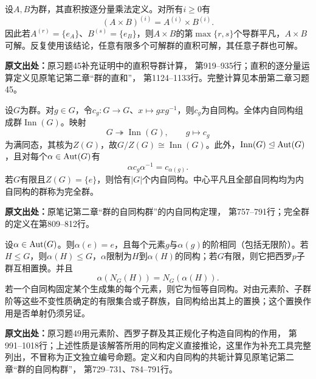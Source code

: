 \begin{reviewprop}[可解群的有限直积]\label{tool:a-solvable-product}
设$A,B$为群，其直积按逐分量乘法定义。对所有$i\ge0$有
\[
(A\times B)^{(i)}=A^{(i)}\times B^{(i)}.
\]
因此若$A^{(r)}=\{e_A\}$、$B^{(s)}=\{e_B\}$，则$A\times B$的第$\max\{r,s\}$个导群平凡，$A\times B$可解。反复使用该结论，任意有限多个可解群的直积可解，其任意子群也可解。

\textbf{原文出处：}原习题45补充证明中的直积导群计算， 第919--935行；直积的逐分量运算定义见原笔记第二章“群的直和”， 第1124--1133行。完整计算见本册第二章习题45。
\end{reviewprop}

\begin{reviewtheorem}[内自同构群与中心商群]\label{tool:a-inner-automorphisms}
设$G$为群。对$g\in G$，令$c_g:G\to G$、$x\mapsto gxg^{-1}$，则$c_g$为自同构。全体内自同构组成群$\operatorname{Inn}(G)$。映射
\[
G\twoheadrightarrow\operatorname{Inn}(G),\qquad g\longmapsto c_g
\]
为满同态，其核为$Z(G)$，故$G/Z(G)\cong\operatorname{Inn}(G)$。此外，$\operatorname{Inn}(G)\trianglelefteq\operatorname{Aut}(G)$，且对每个$\alpha\in\operatorname{Aut}(G)$有
\[
\alpha c_g\alpha^{-1}=c_{\alpha(g)}.
\]
若$G$有限且$Z(G)=\{e\}$，则恰有$|G|$个内自同构。中心平凡且全部自同构均为内自同构的群称为完全群。

\textbf{原文出处：}原笔记第二章“群的自同构群”的内自同构定理， 第757--791行；完全群的定义在第809--812行。
\end{reviewtheorem}

\begin{reviewprop}[自同构保持的元素与子群性质]\label{tool:a-automorphism-invariants}
设$\alpha\in\operatorname{Aut}(G)$。则$\alpha(e)=e$，且每个元素$g$与$\alpha(g)$的阶相同（包括无限阶）。若$H\le G$，则$\alpha(H)\le G$，$\alpha$限制为$H$到$\alpha(H)$的同构；若$G$有限，则它把西罗$p$子群互相置换。并且
\[
\alpha(N_G(H))=N_G(\alpha(H)).
\]
若一个自同构固定某个生成集的每个元素，则它为恒等自同构。对由元素阶、子群阶等这些不变性质确定的有限集合或子群族，自同构给出其上的置换；这个置换作用是否单射仍须另证。

\textbf{原文出处：}原习题49用元素阶、西罗子群及其正规化子构造自同构的作用， 第991--1018行；上述性质是该解答所用的同构定义直接推论，这里作为补充工具完整列出，不冒称为正文独立编号命题。定义和内自同构的共轭计算见原笔记第二章“群的自同构群”， 第729--731、784--791行。
\end{reviewprop}

